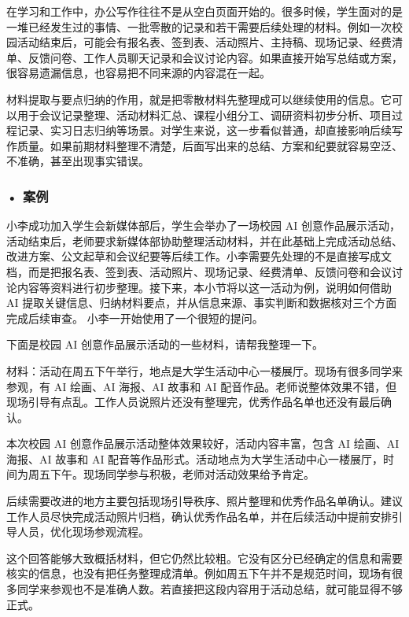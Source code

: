 在学习和工作中，办公写作往往不是从空白页面开始的。很多时候，学生面对的是一堆已经发生过的事情、一批零散的记录和若干需要后续处理的材料。例如一次校园活动结束后，可能会有报名表、签到表、活动照片、主持稿、现场记录、经费清单、反馈问卷、工作人员聊天记录和会议讨论内容。如果直接开始写总结或方案，很容易遗漏信息，也容易把不同来源的内容混在一起。

材料提取与要点归纳的作用，就是把零散材料先整理成可以继续使用的信息。它可以用于会议记录整理、活动材料汇总、课程小组分工、调研资料初步分析、项目过程记录、实习日志归纳等场景。对学生来说，这一步看似普通，却直接影响后续写作质量。如果前期材料整理不清楚，后面写出来的总结、方案和纪要就容易空泛、不准确，甚至出现事实错误。

\subsubsection*{\textbf{• 案例}}

小李成功加入学生会新媒体部后，学生会举办了一场校园 AI 创意作品展示活动，活动结束后，老师要求新媒体部协助整理活动材料，并在此基础上完成活动总结、改进方案、公文起草和会议纪要等后续工作。小李需要先处理的不是直接写成文档，而是把报名表、签到表、活动照片、现场记录、经费清单、反馈问卷和会议讨论内容等资料进行初步整理。接下来，本小节将以这一活动为例，说明如何借助 AI 提取关键信息、归纳材料要点，并从信息来源、事实判断和数据核对三个方面完成后续审查。
小李一开始使用了一个很短的提问。

\begin{userbox}
下面是校园 AI 创意作品展示活动的一些材料，请帮我整理一下。

材料：活动在周五下午举行，地点是大学生活动中心一楼展厅。现场有很多同学来参观，有 AI 绘画、AI 海报、AI 故事和 AI 配音作品。老师说整体效果不错，但现场引导有点乱。工作人员说照片还没有整理完，优秀作品名单也还没有最后确认。
\end{userbox}

\begin{aibox}
本次校园 AI 创意作品展示活动整体效果较好，活动内容丰富，包含 AI 绘画、AI 海报、AI 故事和 AI 配音等作品形式。活动地点为大学生活动中心一楼展厅，时间为周五下午。现场同学参与积极，老师对活动效果给予肯定。

后续需要改进的地方主要包括现场引导秩序、照片整理和优秀作品名单确认。建议工作人员尽快完成活动照片归档，确认优秀作品名单，并在后续活动中提前安排引导人员，优化现场参观流程。
\end{aibox}

这个回答能够大致概括材料，但它仍然比较粗。它没有区分已经确定的信息和需要核实的信息，也没有把任务整理成清单。例如周五下午并不是规范时间，现场有很多同学来参观也不是准确人数。若直接把这段内容用于活动总结，就可能显得不够正式。

